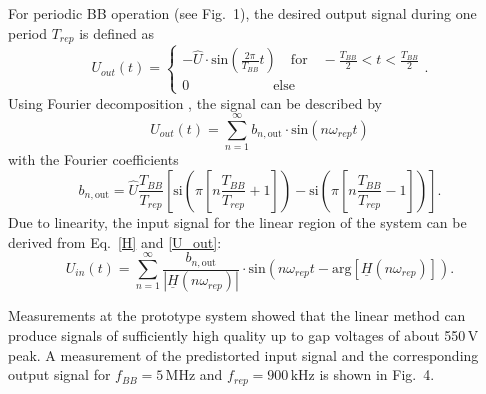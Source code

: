 \documentclass[a4paper,
               keeplastbox,%
               nospread%
              ]{jacow}
\begin{document}
For periodic BB operation (see Fig.~1), the desired output signal during one period $T_{rep}$ is defined as
	\begin{equation}
	 U_{out}(t)=\begin{cases}
	             -\hat{U}\cdot \text{sin}\left(\frac{2\pi}{T_{BB}}t\right) \quad \text{for} \quad -\frac{T_{BB}}{2}<t<\frac{T_{BB}}{2} \\
	             0 \qquad \qquad \qquad \text{else}
	            \end{cases}.
	\end{equation}
	Using Fourier decomposition \cite{gross}, the signal can be described by 
	\begin{equation}
	  U_{out}(t)=\sum \limits_{n=1}^\infty b_{n,\text{out}}\cdot \text{sin}(n\omega_{rep}t)
	  \label{U_out}
	\end{equation}
	with the Fourier coefficients
	\begin{equation}
	  b_{n, \text{out}}=\hat{U}\frac{T_{BB}}{T_{rep}}\left[\text{si}\left(\pi\left[n\frac{T_{BB}}{T_{rep}}+1\right]\right)-\text{si}\left(\pi\left[n\frac{T_{BB}}{T_{rep}}-1\right]\right)\right].
	\end{equation}	
	Due to linearity, the input signal for the linear region of the system can be derived from Eq.~\eqref{H} and \eqref{U_out}:
	\begin{equation}
	  U_{in}(t)=\sum \limits_{n=1}^\infty \frac{b_{n,\text{out}}}{|\underline{H}(n\omega_{rep})|}\cdot \text{sin}\left(n\omega_{rep}t-\text{arg}[\underline{H}(n\omega_{rep})]\right).
	  \label{VV_lin}
	\end{equation}

	Measurements at the prototype system showed that the linear method can	produce signals of sufficiently high quality up to gap voltages of about 550\,V peak. A measurement of the predistorted input signal and 
	the corresponding output signal for \mbox{$f_{BB}=5\,\text{MHz}$} and \mbox{$f_{rep}=900\,\text{kHz}$} is shown in Fig.~4. 
			
\end{document}
